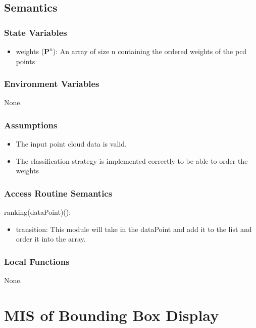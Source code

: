 \documentclass[12pt, titlepage]{article}
\begin{document}
\subsection{Semantics}

\subsubsection{State Variables}

\begin{itemize}
  \item weights ($\mathbf{P}^{n}$): An array of size n containing the ordered weights of the pcd points
\end{itemize}

\subsubsection{Environment Variables}

None.

\subsubsection{Assumptions}

\begin{itemize}
  \item The input point cloud data is valid.
  \item The classification strategy is implemented correctly to be able to order the weights
\end{itemize}

\subsubsection{Access Routine Semantics}

\noindent ranking(dataPoint)():
\begin{itemize}
  \item transition: This module will take in the dataPoint and add it to the list and order it into the array.
\end{itemize}

\subsubsection{Local Functions}

None.
\newpage


\section{MIS of Bounding Box Display} \label{ModuleBBD} 
\end{document}
